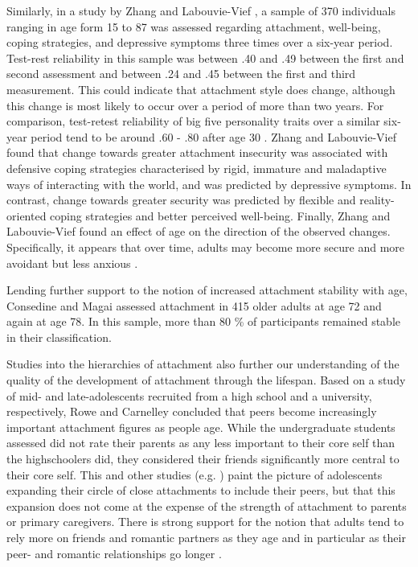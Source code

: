 \documentclass[12pt]{report}
\begin{document}
Similarly, in a study by Zhang and Labouvie-Vief \citeyear{Zhang2004}, a sample of 370 individuals ranging in age form 15 to 87 was assessed regarding attachment, well-being, coping strategies, and depressive symptoms three times over a six-year period.
Test-rest reliability in this sample was between .40 and .49 between the first and second assessment and between .24 and .45 between the first and third measurement. This could indicate that attachment style does change, although this change is most likely to occur over a period of more than two years.
For comparison, test-retest reliability of big five personality traits over a similar six-year period tend to be around .60 - .80 after age 30 \cite{Costa1988,Roberts2000}.
Zhang and Labouvie-Vief \citeyear{Zhang2004} found that change towards greater attachment insecurity was associated with defensive coping strategies characterised by rigid, immature and maladaptive ways of interacting with the world, and was predicted by depressive symptoms.
In contrast, change towards greater security was predicted by flexible and reality-oriented coping strategies and better perceived well-being.
Finally, Zhang and Labouvie-Vief found an effect of age on the direction of the observed changes. Specifically, it appears that over time, adults may become more secure and more avoidant but less anxious  \cite{Zhang2004}.

Lending further support to the notion of increased attachment stability with age, Consedine and Magai assessed attachment in 415 older adults at age 72 and again at age 78.
In this sample, more than 80 \% of participants remained stable in their classification.

Studies into the hierarchies of attachment also further our understanding of the quality of the development of attachment through the lifespan.
Based on a study of mid- and late-adolescents recruited from a high school and a university, respectively, Rowe and Carnelley \citeyear{Rowe2005} concluded that peers become increasingly important attachment figures as people age. While the undergraduate students assessed did not rate their parents as any less important to their core self than the highschoolers did, they considered their friends significantly more central to their core self.
This and other studies (e.g. ) paint the picture of adolescents expanding their circle of close attachments to include their peers, but that this expansion does not come at the expense of the strength of attachment to parents or primary caregivers.
There is strong support for the notion that adults tend to rely more on friends and romantic partners as they age and in particular as their peer- and romantic relationships go longer \cite{Tancredy2006,Doherty2004,Fraley1997}.
\end{document}
